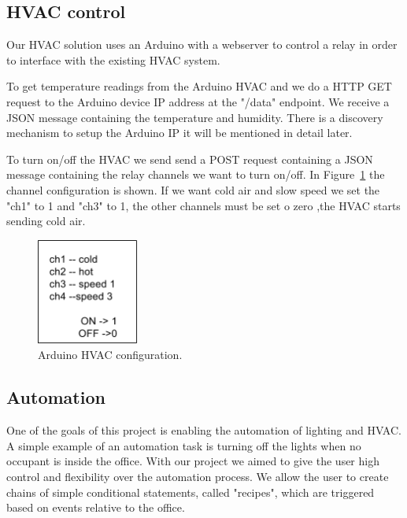 \subsection{HVAC control}

Our HVAC solution uses an Arduino with a webserver to control a relay in order to interface with the existing HVAC system.

To get temperature readings from the Arduino \ac{HVAC} and we do a \ac{HTTP}  GET request to the Arduino device IP address at the "/data" endpoint. We receive a \ac{JSON} message containing the temperature and humidity. There is a discovery mechanism to setup the Arduino IP it will be mentioned in detail later.

To turn on/off the \ac{HVAC} we send send a POST request containing a \ac{JSON} message containing the relay channels we want to turn on/off. In Figure~\ref{arduino_post_imp} the channel configuration is shown. If we want cold air   and slow speed we set the "ch1" to 1 and "ch3" to 1, the other channels must be set o zero ,the \ac{HVAC} starts sending cold air.


\begin{figure}[h]
\centering
\includegraphics[width=0.3\textwidth]{Figures/temperature_post_imp}
\caption{Arduino HVAC configuration.}
\label{arduino_post_imp}
\end{figure}




\subsection{Automation}

One of the goals of this project is enabling the automation of lighting and \ac{HVAC}. A simple example of an automation task is turning off the lights when no occupant is inside the office.
With our project we aimed to give the user high control and flexibility over the automation process. We allow the user to create chains of simple conditional statements, called "recipes", which are triggered based on events relative to the office.


